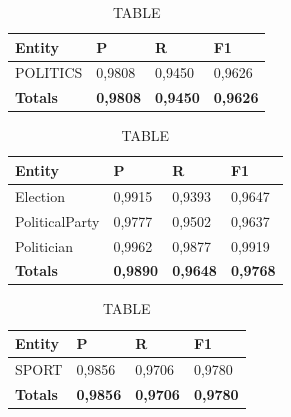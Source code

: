 \documentclass[thesis=M,english]{FITthesis}[2018/05/30]
\begin{document}

	\begin{table}[H]\centering
		\caption{TABLE}
		\label{}
		\begin{tabular}{|l|l|l|l|}
			\hline {\textbf{Entity}} & {\textbf{P}} & {\textbf{R}} & {\textbf{F1}}\\\hline
				POLITICS & 0,9808 & 0,9450 & 0,9626\\\hline
				\textbf{Totals} & \textbf{0,9808} & \textbf{0,9450} & \textbf{0,9626}\\\hline
		\end{tabular}
	\end{table}

	\begin{table}[H]\centering
		\caption{TABLE}
		\label{}
		\begin{tabular}{|l|l|l|l|}
			\hline {\textbf{Entity}} & {\textbf{P}} & {\textbf{R}} & {\textbf{F1}}\\\hline
				Election & 0,9915 & 0,9393 & 0,9647\\
				PoliticalParty & 0,9777 & 0,9502 & 0,9637\\
				Politician & 0,9962 & 0,9877 & 0,9919\\\hline
				\textbf{Totals} & \textbf{0,9890} & \textbf{0,9648} & \textbf{0,9768}\\\hline
		\end{tabular}
	\end{table}	
	

	\begin{table}[H]\centering
		\caption{TABLE}
		\label{}
		\begin{tabular}{|l|l|l|l|}
			\hline {\textbf{Entity}} & {\textbf{P}} & {\textbf{R}} & {\textbf{F1}}\\\hline
				SPORT & 0,9856 & 0,9706 & 0,9780\\\hline
				\textbf{Totals} & \textbf{0,9856} & \textbf{0,9706} & \textbf{0,9780}\\\hline
		\end{tabular}
	\end{table}
\end{document}
